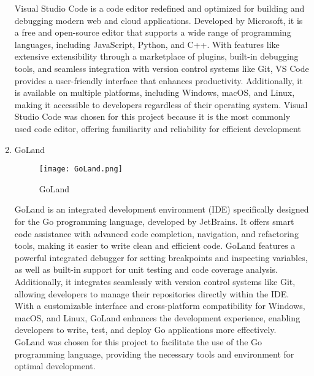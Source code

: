 \documentclass[conference]{IEEEtran}
\begin{document}
\begin{enumerate}[itemsep=2ex, parsep=1ex]
	      Visual Studio Code is a code editor redefined and optimized for building
	      and debugging modern web and cloud applications. Developed by Microsoft,
	      it is a free and open-source editor that supports a wide range of
	      programming languages, including JavaScript, Python, and C++. With
	      features like extensive extensibility through a marketplace of plugins, built-in
	      debugging tools, and seamless integration with version control systems
	      like Git, VS Code provides a user-friendly interface that enhances productivity.
	      Additionally, it is available on multiple platforms, including Windows, macOS,
	      and Linux, making it accessible to developers regardless of their operating
	      system. Visual Studio Code was chosen for this project because it is the
	      most commonly used code editor, offering familiarity and reliability for efficient
	      development
	      	      
	      \vspace{5cm}
	      	      	      
	\item GoLand
	      	      	      
	      \begin{figure}[h!]
	      	\centering
	      	\texttt{[image: GoLand.png]}
	      	\caption{GoLand}
	      	\label{fig:GoLand}
	      \end{figure}
	      	      	      
	      GoLand is an integrated development environment (IDE) specifically
	      designed for the Go programming language, developed by JetBrains. It
	      offers smart code assistance with advanced code completion, navigation,
	      and refactoring tools, making it easier to write clean and efficient code.
	      GoLand features a powerful integrated debugger for setting breakpoints and
	      inspecting variables, as well as built-in support for unit testing and code
	      coverage analysis. Additionally, it integrates seamlessly with version control
	      systems like Git, allowing developers to manage their repositories
	      directly within the IDE. With a customizable interface and cross-platform compatibility
	      for Windows, macOS, and Linux, GoLand enhances the development experience,
	      enabling developers to write, test, and deploy Go applications more effectively.
	      GoLand was chosen for this project to facilitate the use of the Go
	      programming language, providing the necessary tools and environment for optimal
	      development.
	      	      	      

\end{enumerate}
\end{document}
